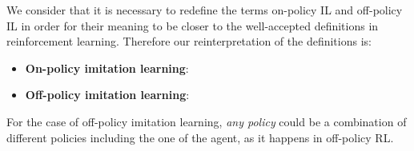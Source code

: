 \setlength{\parskip}{1em} 




We consider that it is necessary to redefine the terms on-policy IL and off-policy IL in order for their meaning to be closer to the well-accepted definitions in reinforcement learning. Therefore our reinterpretation of the definitions is:



\begin{itemize}
  \item \textbf{On-policy imitation learning}: 
  
  \item \textbf{Off-policy imitation learning}: 
  


\end{itemize}

For the case of off-policy imitation learning, \textit{any policy} could be a combination of different policies including the one of the agent, as it happens in off-policy RL.


